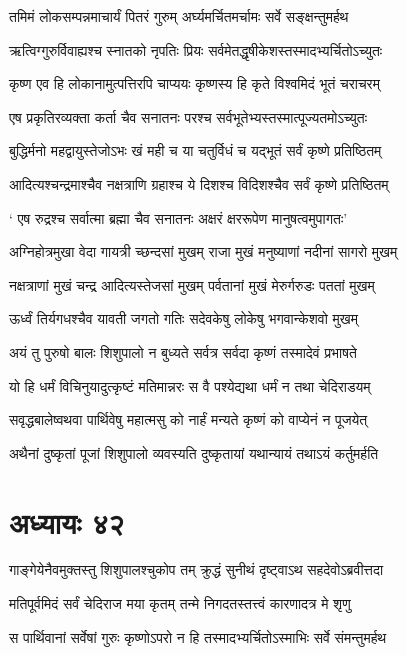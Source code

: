 \twolineshloka
{तमिमं लोकसम्पन्नमाचार्यं पितरं गुरुम्}
{अर्घ्यमर्चितमर्चामः सर्वे सङ्क्षन्तुमर्हथ}


\twolineshloka
{ऋत्विग्गुरुर्विवाह्यश्च स्नातको नृपतिः प्रियः}
{सर्वमेतद्धृषीकेशस्तस्मादभ्यर्चितोऽच्युतः}


\twolineshloka
{कृष्ण एव हि लोकानामुत्पत्तिरपि चाप्ययः}
{कृष्णस्य हि कृते विश्वमिदं भूतं चराचरम्}


\twolineshloka
{एष प्रकृतिरव्यक्ता कर्ता चैव सनातनः}
{परश्च सर्वभूतेभ्यस्तस्मात्पूज्यतमोऽच्युतः}


\twolineshloka
{बुद्धिर्मनो महद्वायुस्तेजोऽभः खं मही च या}
{चतुर्विधं च यद्भूतं सर्वं कृष्णे प्रतिष्ठितम्}


\twolineshloka
{आदित्यश्चन्द्रमाश्चैव नक्षत्राणि ग्रहाश्च ये}
{दिशश्च विदिशश्चैव सर्वं कृष्णे प्रतिष्ठितम्}


\twolineshloka
{` एष रुद्रश्च सर्वात्मा ब्रह्मा चैव सनातनः}
{अक्षरं क्षररूपेण मानुषत्वमुपागतः'}


\twolineshloka
{अग्निहोत्रमुखा वेदा गायत्री च्छन्दसां मुखम्}
{राजा मुखं मनुष्याणां नदीनां सागरो मुखम्}


\twolineshloka
{नक्षत्राणां मुखं चन्द्र आदित्यस्तेजसां मुखम्}
{पर्वतानां मुखं मेरुर्गरुडः पततां मुखम्}


\twolineshloka
{ऊर्ध्वं तिर्यगधश्चैव यावती जगतो गतिः}
{सदेवकेषु लोकेषु भगवान्केशवो मुखम्}


\twolineshloka
{अयं तु पुरुषो बालः शिशुपालो न बुध्यते}
{सर्वत्र सर्वदा कृष्णं तस्मादेवं प्रभाषते}


\twolineshloka
{यो हि धर्मं विचिनुयादुत्कृष्टं मतिमान्नरः}
{स वै पश्येद्यथा धर्मं न तथा चेदिराडयम्}


\twolineshloka
{सवृद्धबालेष्वथवा पार्थिवेषु महात्मसु}
{को नार्हं मन्यते कृष्णं को वाप्येनं न पूजयेत्}


\twolineshloka
{अथैनां दुष्कृतां पूजां शिशुपालो व्यवस्यति}
{दुष्कृतायां यथान्यायं तथाऽयं कर्तुमर्हति}


\chapter{अध्यायः ४२}
\twolineshloka
{गाङ्गेयेनैवमुक्तस्तु शिशुपालश्चुकोप तम्}
{क्रुद्धं सुनीथं दृष्ट्वाऽथ सहदेवोऽब्रवीत्तदा}


\twolineshloka
{मतिपूर्वमिदं सर्वं चेदिराज मया कृतम्}
{तन्मे निगदतस्तत्त्वं कारणादत्र मे शृणु}


\twolineshloka
{स पार्थिवानां सर्वेषां गुरुः कृष्णोऽपरो न हि}
{तस्मादभ्यर्चितोऽस्माभिः सर्वे संमन्तुमर्हथ}


